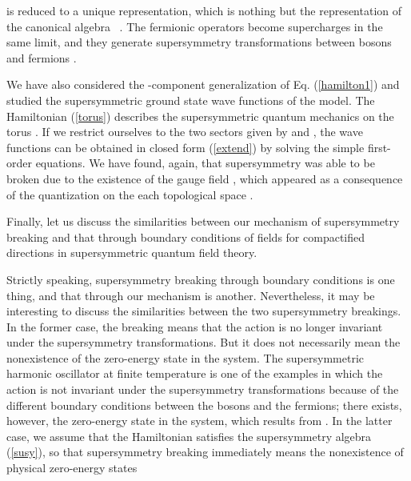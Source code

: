 \documentclass[a4paper,12pt]{article}
\begin{document}
{is reduced to a unique representation, which is nothing but the 
representation of the canonical algebra \coordHE{}~. 
The fermionic operators become supercharges in the same limit, and they
generate supersymmetry transformations between 
bosons \coordHE{} and fermions \myHighlight{$(\hxi, \hxib)$}\coordHE{}.
\par
We have also considered the \coordHE{}-component generalization 
of Eq. (\ref{hamilton1})
and studied the supersymmetric ground state wave functions of the model.
The Hamiltonian (\ref{torus}) describes the supersymmetric quantum mechanics 
on the torus \coordHE{}. If we restrict ourselves to the 
two sectors given by \myHighlight{$\ket{-}$}\coordHE{} and \myHighlight{$\ket{+}$}\coordHE{}, the wave functions 
can be obtained in closed form (\ref{extend}) by solving the simple 
first-order equations. We have found, again, that supersymmetry 
was able to be broken due to the existence of the gauge 
field \coordHE{}, which appeared  
as a consequence of the quantization on the each topological space \coordHE{}. 
\par
Finally, let us discuss the similarities between our mechanism of 
supersymmetry breaking and that through boundary conditions
of fields for compactified directions in 
supersymmetric quantum field theory.
\par
Strictly speaking, supersymmetry breaking through boundary conditions
is one thing, and that through our mechanism is another.
Nevertheless, it may be interesting to discuss the similarities
between the two supersymmetry breakings. 
In the former case, the breaking means that the action is no 
longer invariant under the supersymmetry transformations. But it does 
not necessarily mean the nonexistence of the zero-energy state 
in the system. The supersymmetric 
harmonic oscillator at finite temperature is one of the examples in which
the action is not invariant under the supersymmetry transformations 
because of the different boundary conditions between the bosons and the 
fermions; there exists, however, the zero-energy state in the system, which 
results from \coordHE{} \cite{fuchs}. 
In the latter case, we  assume  
that the Hamiltonian satisfies the supersymmetry algebra ({\ref{susy}), so 
that supersymmetry breaking immediately
means the nonexistence of physical zero-energy states 
}}
\end{document}
